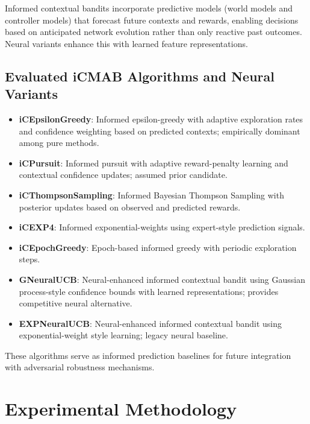 \documentclass[12pt,a4paper]{article}
\begin{document}
Informed contextual bandits incorporate predictive models (world models and controller models) that forecast future contexts and rewards, enabling decisions based on anticipated network evolution rather than only reactive past outcomes. Neural variants enhance this with learned feature representations.

\subsection{Evaluated iCMAB Algorithms and Neural Variants}
\begin{itemize}
\item \textbf{iCEpsilonGreedy}: Informed epsilon-greedy with adaptive exploration rates and confidence weighting based on predicted contexts; empirically dominant among pure methods.
\item \textbf{iCPursuit}: Informed pursuit with adaptive reward-penalty learning and contextual confidence updates; assumed prior candidate.
\item \textbf{iCThompsonSampling}: Informed Bayesian Thompson Sampling with posterior updates based on observed and predicted rewards.
\item \textbf{iCEXP4}: Informed exponential-weights using expert-style prediction signals.
\item \textbf{iCEpochGreedy}: Epoch-based informed greedy with periodic exploration steps.
\item \textbf{GNeuralUCB}: Neural-enhanced informed contextual bandit using Gaussian process-style confidence bounds with learned representations; provides competitive neural alternative.
\item \textbf{EXPNeuralUCB}: Neural-enhanced informed contextual bandit using exponential-weight style learning; legacy neural baseline.
\end{itemize}

These algorithms serve as informed prediction baselines for future integration with adversarial robustness mechanisms.

\section{Experimental Methodology}
\end{document}
